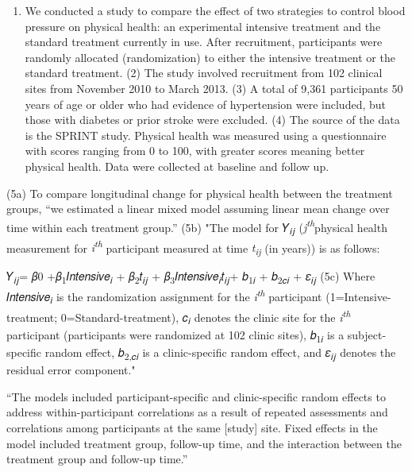 \documentclass[
  openany]{book}
\providecommand{\tightlist}{%
  \setlength{\itemsep}{0pt}\setlength{\parskip}{0pt}}
\begin{document}
\begin{enumerate}
\def\labelenumi{(\arabic{enumi})}
\tightlist
\item
  We conducted a study to compare the effect of two strategies to control blood pressure on physical health: an experimental intensive treatment and the standard treatment currently in use. After recruitment, participants were randomly allocated (randomization) to either the intensive treatment or the standard treatment. (2) The study involved recruitment from 102 clinical sites from November 2010 to March 2013. (3) A total of 9,361 participants 50 years of age or older who had evidence of hypertension were included, but those with diabetes or prior stroke were excluded. (4) The source of the data is the SPRINT study. Physical health was measured using a questionnaire with scores ranging from 0 to 100, with greater scores meaning better physical health. Data were collected at baseline and follow up.
\end{enumerate}

(5a) To compare longitudinal change for physical health between the treatment groups, ``we estimated a linear mixed model assuming linear mean change over time within each treatment group.'' (5b) "The model for 𝑌\textsubscript{𝑖𝑗} (\emph{j\textsuperscript{th}}physical health measurement for \emph{i\textsuperscript{th}} participant measured at time \emph{t\textsubscript{ij}} (in years)) is as follows:

𝑌\textsubscript{𝑖𝑗}= 𝛽0 +𝛽\textsubscript{1}𝐼𝑛𝑡𝑒𝑛𝑠𝑖𝑣𝑒\textsubscript{𝑖} + 𝛽\textsubscript{2}𝑡\textsubscript{𝑖𝑗} + 𝛽\textsubscript{3}𝐼𝑛𝑡𝑒𝑛𝑠𝑖𝑣𝑒\textsubscript{𝑖}𝑡\textsubscript{𝑖𝑗}+ 𝑏\textsubscript{1𝑖} + 𝑏\textsubscript{2𝑐𝑖} + 𝜀\textsubscript{𝑖𝑗} (5c) Where 𝐼𝑛𝑡𝑒𝑛𝑠𝑖𝑣𝑒\textsubscript{𝑖} is the randomization assignment for the \emph{i\textsuperscript{th}} participant (1=Intensive-treatment; 0=Standard-treatment), 𝑐\textsubscript{𝑖} denotes the clinic site for the \emph{i\textsuperscript{th}} participant (participants were randomized at 102 clinic sites), 𝑏\textsubscript{1𝑖} is a subject-specific random effect, 𝑏\textsubscript{2,𝑐𝑖} is a clinic-specific random effect, and 𝜀\textsubscript{𝑖𝑗} denotes the residual error component."

``The models included participant-specific and clinic-specific random effects to address within-participant correlations as a result of repeated assessments and correlations among participants at the same {[}study{]} site. Fixed effects in the model included treatment group, follow-up time, and the interaction between the treatment group and follow-up time.''
\end{document}
